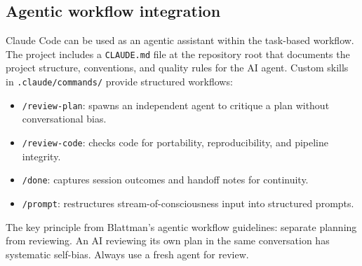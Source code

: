 \subsection{Agentic workflow integration}

Claude Code can be used as an agentic assistant within the task-based workflow.
The project includes a \texttt{CLAUDE.md} file at the repository root that documents
the project structure, conventions, and quality rules for the AI agent.
Custom skills in \texttt{.claude/commands/} provide structured workflows:
\begin{itemize}
	\item \texttt{/review-plan}: spawns an independent agent to critique a plan without conversational bias.
	\item \texttt{/review-code}: checks code for portability, reproducibility, and pipeline integrity.
	\item \texttt{/done}: captures session outcomes and handoff notes for continuity.
	\item \texttt{/prompt}: restructures stream-of-consciousness input into structured prompts.
\end{itemize}
The key principle from Blattman's agentic workflow guidelines:
separate planning from reviewing.
An AI reviewing its own plan in the same conversation has systematic self-bias.
Always use a fresh agent for review.
